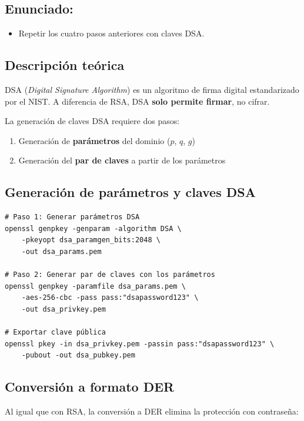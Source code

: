 \subsection{Enunciado:}
\begin{itemize}[label=\textbullet]
    \item Repetir los cuatro pasos anteriores con claves DSA.
\end{itemize}

\subsection{Descripción teórica}

DSA (\textit{Digital Signature Algorithm}) es un algoritmo de firma digital estandarizado por el NIST. A diferencia de RSA, DSA \textbf{solo permite firmar}, no cifrar.

La generación de claves DSA requiere dos pasos:
\begin{enumerate}
    \item Generación de \textbf{parámetros} del dominio ($p$, $q$, $g$)
    \item Generación del \textbf{par de claves} a partir de los parámetros
\end{enumerate}

\subsection{Generación de parámetros y claves DSA}

\begin{lstlisting}[caption=Generación de claves DSA]
# Paso 1: Generar parámetros DSA
openssl genpkey -genparam -algorithm DSA \
    -pkeyopt dsa_paramgen_bits:2048 \
    -out dsa_params.pem

# Paso 2: Generar par de claves con los parámetros
openssl genpkey -paramfile dsa_params.pem \
    -aes-256-cbc -pass pass:"dsapassword123" \
    -out dsa_privkey.pem

# Exportar clave pública
openssl pkey -in dsa_privkey.pem -passin pass:"dsapassword123" \
    -pubout -out dsa_pubkey.pem
\end{lstlisting}

\subsection{Conversión a formato DER}

Al igual que con RSA, la conversión a DER elimina la protección con contraseña:


